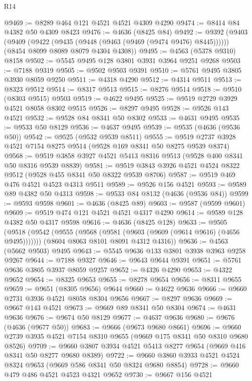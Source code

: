 \begin{lexlean}{R14}
\begin{coremodule}
@9469 := @8289 @464 @121 @4521 @4521 @4309 @4290
@9474 := @8414 @84 @4382 @50 @4309 @8423
@9476 := @4636 (@8425 @84)
@9492 := @9392
    (@9403
      (@9409 (@9422 (@9435 (@9448 (@9463 (@9469 (@9474 @9476) @8445))))))
      (@8454 @8099 @8089 @8079 @4304 @4308))
@9495 := @4563 (@5378 @9310) @8158
@9502 := @5545 @9495 @128 @3801 @3931 @3964 @9251 @9268
@9503 := @7188 @9319
@9505 := @9502 @9503 @9391
@9510 := @5761 @9495 @3805 @3930 @8059 @9250
@9511 := @4318 @4290
@9512 := @4314 @9511
@9513 := @8323 @9512
@9514 := @8317 @9513
@9515 := @8276 @9514
@9518 := @9510 (@8303 @9515) @9503
@9519 := @4622 @9495
@9525 := @9519 @2729 @3929 @4521 @8058 @8302 @9515
@9526 := @8297 @9495
@9528 := @9526 @143 @4521
@9532 := @9528 @84 @8341 @50 @8302
@9533 := @4631 @9495
@9535 := @9533 @50 @8129
@9536 := @4637 @9495
@9539 := @9535 (@4636 (@9536 @50))
@9542 := @9525 (@9532 @9539 @8511)
@9555 := @9519 @2737 @3928 @4521 @7154 @8275 @9514 (@9528 @169 @8341 @50 @8275 @9539 @8374)
@9568 := @9519 @3858 @3927 @4521 @5413 @8316 @9513 (@9528 @400 @8341 @50 @8316 @9539 @8839)
@9581 := @9519 @3843 @3926 @4521 @4524 @8322 @9512 (@9528 @455 @8341 @50 @8322 @9539 @8706)
@9587 := @9519 @469 @476 @4521 @4523 @4313 @9511
@9589 := @9526 @156 @4521
@9593 := @9589 @89 @4382 @50 @4313
@9598 := @9533 @84 @8132 (@4636 (@9536 @84))
@9599 := @9593 @9598
@9601 := @4636 (@8425 @89)
@9603 := @9587 (@9599 @9601)
@9609 := @9519 @474 @121 @4521 @4521 @4317 @4290
@9614 := @9589 @128 @4382 @50 @4317 @9598
@9616 := @4636 (@8425 @128)
@9633 := @9505
    (@9518
      (@9542 (@9555 (@9568 (@9581 (@9603 (@9609 (@9614 @9616) (@4656 @9495)))))))
      (@8604 @8063 @8101 @8091 @4312 @4316))
@9636 := @4563 (@5662 @9503) @9495
@9643 := @5545 @9636 @133 @3801 @3938 @3963 @9258 @9267
@9644 := @7188 @9327
@9646 := @9643 @9644 @9391
@9651 := @5761 @9636 @3805 @3937 @8059 @9257
@9652 := @4326 @4290
@9653 := @4322 @9652
@9654 := @8325 @9653
@9655 := @8278 @9654
@9656 := @8311 @9655
@9659 := @9651 (@8305 @9656) @9644
@9660 := @4622 @9636
@9666 := @9660 @2731 @3936 @4521 @8058 @8304 @9656
@9667 := @8297 @9636
@9669 := @9667 @143 @4521
@9673 := @9669 @89 @8341 @50 @8304
@9674 := @4631 @9636
@9676 := @9674 @50 @8129
@9677 := @4637 @9636
@9680 := @9676 (@4636 (@9677 @50))
@9683 := @9666 (@9673 @9680 @8661)
@9696 := @9660 @2739 @3935 @4521 @7154 @8310 @9655 (@9669 @175 @8341 @50 @8310 @9680 @8526)
@9709 := @9660 @3807 @3934 @4521 @5413 @8277 @9654 (@9669 @416 @8341 @50 @8277 @9680 @8389)
@9722 := @9660 @3860 @3933 @4521 @4524 @8324 @9653 (@9669 @586 @8341 @50 @8324 @9680 @8854)
@9728 := @9660 @479 @486 @4521 @4523 @4321 @9652
@9730 := @9667 @156 @4521

\end{coremodule}
\end{lexlean}
